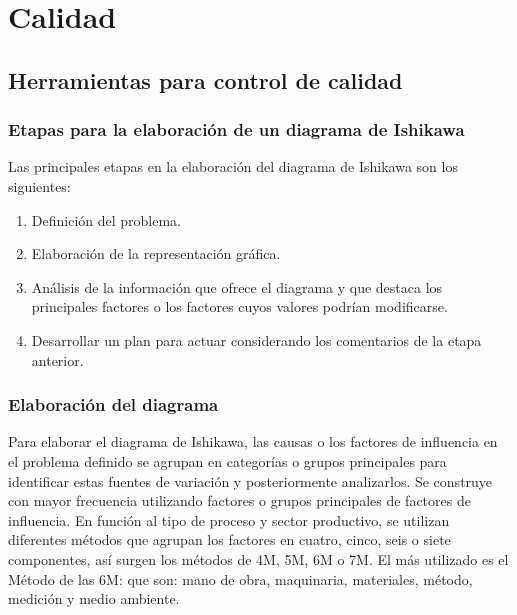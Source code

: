 \documentclass[../main]{subfiles}
\begin{document}
\chapter{Calidad}
\section{Herramientas para control de calidad}
\subsection{Etapas para la elaboración de un diagrama de Ishikawa}
Las principales etapas en la elaboración del diagrama de Ishikawa son
los siguientes:
\begin{enumerate}
  \item Definición del problema.
  \item Elaboración de la representación gráfica.
  \item Análisis de la información que ofrece el diagrama y que
    destaca los principales factores o los factores cuyos valores
    podrían modificarse.
  \item Desarrollar un plan para actuar considerando los comentarios
    de la etapa anterior.
\end{enumerate}
\subsection{Elaboración del diagrama}
Para elaborar el diagrama de Ishikawa, las causas o los factores de
influencia en el problema definido se agrupan en categorías o grupos
principales para identificar estas fuentes de variación y
posteriormente analizarlos. Se construye con mayor frecuencia
utilizando factores o grupos principales de factores de influencia.
En función al tipo de proceso y sector productivo, se utilizan
diferentes métodos que agrupan los factores en cuatro, cinco, seis
o siete componentes, así surgen los métodos de 4M, 5M, 6M o 7M.
El más utilizado es el Método de las 6M: que son: mano de obra,
maquinaria, materiales, método, medición y medio ambiente.
\end{document}
